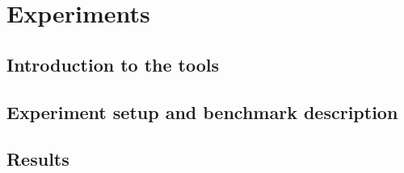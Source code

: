 \section{Experiments}

\subsection{Introduction to the tools}


\subsection{Experiment setup and benchmark description}


\subsection{Results}

